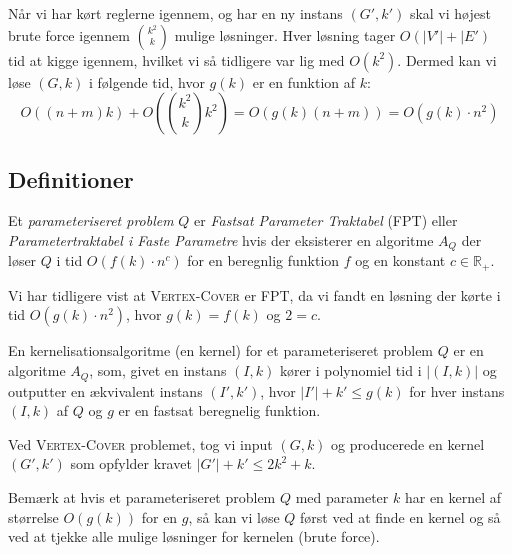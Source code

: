 Når vi har kørt reglerne igennem, og har en ny instans $(G', k')$ skal vi højest brute force igennem $\binom{k^{2}}{k}$ mulige løsninger. Hver løsning tager $O(|V'|+|E')$ tid at kigge igennem, hvilket vi så tidligere var lig med $O(k^{2})$. Dermed kan vi løse $(G, k)$ i følgende tid, hvor $g(k)$ er en funktion af $k$:
\begin{equation*}
	O((n+m)k) + O(\binom{k^{2}}{k}k^{2}) = O(g(k)(n+m)) = O(g(k)\cdot n^{2})
\end{equation*}

\subsection{Definitioner}%
\label{subsec:label}

\begin{definition}
	Et \textit{parameteriseret problem} $Q$ er \textit{Fastsat Parameter Traktabel} (FPT) eller \textit{Parametertraktabel i Faste Parametre} hvis der eksisterer en algoritme $A_{Q}$ der løser $Q$ i tid $O(f(k) \cdot n^{c})$ for en beregnlig funktion $f$ og en konstant $c \in \mathbb{R}_{+}$.
\end{definition}

Vi har tidligere vist at \textsc{Vertex-Cover} er FPT, da vi fandt en løsning der kørte i tid $O(g(k) \cdot n^{2})$, hvor $g(k) = f(k)$ og $2 = c$.

\begin{definition}
	En kernelisationsalgoritme (en kernel) for et parameteriseret problem $Q$ er en algoritme $A_{Q}$, som, givet en instans $(I,k)$ kører i polynomiel tid i $|(I,k)|$ og outputter en ækvivalent instans $(I', k')$, hvor $|I'| + k' \le g(k)$ for hver instans $(I, k)$ af $Q$ og $g$ er en fastsat beregnelig funktion.
\end{definition}

Ved \textsc{Vertex-Cover} problemet, tog vi input $(G, k)$ og producerede en kernel $(G', k')$ som opfylder kravet $|G'| + k' \le 2k^{2} + k$.

Bemærk at hvis et parameteriseret problem $Q$ med parameter $k$ har en kernel af størrelse $O(g(k))$ for en $g$, så kan vi løse $Q$ først ved at finde en kernel og så ved at tjekke alle mulige løsninger for kernelen (brute force).


